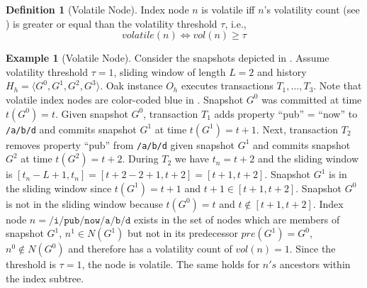 \documentclass[abstracton,12pt]{scrartcl}
\theoremstyle{definition}
\newtheorem{definition}{Definition}
\newtheorem{example}{Example}
\begin{document}
\vspace{-4mm}

\begin{definition}[Volatile Node]
  Index node $n$ is volatile iff $n$'s volatility count (see
  ) is greater or equal than the volatility threshold
  $\tau$, i.e.,
  $$ volatile(n) \iff vol(n) \geq \tau $$
  \label{def:volatile_node}
\end{definition}

\vspace{-4mm}

\begin{example}[Volatile Node]
  Consider the snapshots depicted in . Assume volatility
  threshold $\tau = 1$, sliding window of length $L = 2$ and history $H_h
  = \langle G^0,G^1,G^2,G^3 \rangle$. Oak instance $O_h$ executes transactions
  $T_1, \dots , T_3$. Note that volatile index nodes are color-coded
  blue in . Snapshot $G^0$ was committed at time
  $t(G^0) = t$. Given snapshot $G^0$,
  transaction $T_1$ adds property ``pub'' = ``now'' to
  \texttt{/a/b/d} and commits snapshot $G^1$ at time $t(G^1) = t + 1$. Next,
  transaction $T_2$ removes property ``pub'' from \texttt{/a/b/d} given snapshot
  $G^1$ and commits snapshot $G^2$ at time $t(G^2) = t + 2$. During $T_2$ we
  have $t_n=t+2$ and the sliding window is $[t_n-L+1,t_n] = [t+2-2+1,t+2] =
  [t+1,t+2]$. Snapshot $G^1$ is in the sliding window since $t(G^1)=t+1$ and
  $t+1 \in [t+1,t+2]$.
  Snapshot $G^0$ is not in the sliding window because $t(G^0) = t$ and $t \notin
  [t+1,t+2]$. Index node $n = \texttt{/i/pub/now/a/b/d}$ exists in the set of
  nodes which are members of snapshot $G^1$, $n^1 \in N(G^1)$ but not in its
  predecessor $pre(G^1) = G^0$, $n^0 \notin N(G^0)$ and therefore has a volatility
  count of $vol(n) = 1$. Since the threshold is $\tau = 1$, the node is
  volatile. The same holds for $n's$ ancestors within the index subtree.

  \label{ex:volatile_node}
\end{example}

\vspace{-1mm}
\end{document}
